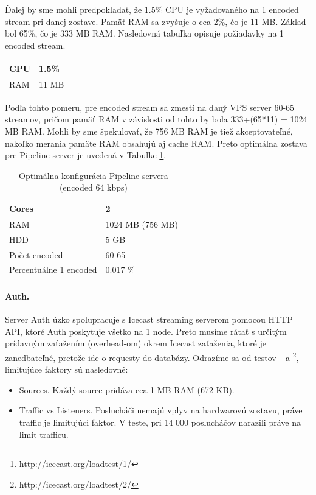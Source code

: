 \documentclass[11pt]{article}
\begin{document}
Ďalej by sme mohli predpokladať, že 1.5\% CPU je vyžadovaného na 1 encoded stream pri danej zostave. Pamäť RAM sa zvyšuje o cca 2\%, čo je 11 MB. Základ bol 65\%, čo je 333 MB RAM. Nasledovná tabuľka opisuje požiadavky na 1 encoded stream.


\begin{center}
\begin{tabular}{|l|l|}
\hline
	CPU & 1.5\%\\
\hline
	RAM & 11 MB\\
\hline
\end{tabular}
\end{center}

Podľa tohto pomeru, pre encoded stream sa zmestí na daný VPS server 60-65 streamov, pričom pamäť RAM v závislosti od tohto by bola 333+(65*11) = 1024 MB RAM. Mohli by sme špekulovať, že 756 MB RAM je tiež akceptovateľné, nakoľko merania pamäte RAM obsahujú aj cache RAM. Preto optimálna zostava pre Pipeline server je uvedená v Tabuľke \ref{konf2}.

\begin{table}[htp]
\centering
\begin{tabular}{|l|l|}
\hline
	Cores & 2\\
\hline
	RAM & 1024 MB (756 MB)\\
\hline
	HDD & 5 GB\\
\hline
	Počet encoded & 60-65\\
\hline
	Percentuálne 1 encoded & 0.017 \%\\
\hline
\end{tabular}
\caption{Optimálna konfigurácia Pipeline servera (encoded 64 kbps)}
\label{konf2}
\end{table}






\paragraph{Auth.} Server Auth úzko spolupracuje s Icecast streaming serverom pomocou HTTP API, ktoré Auth poskytuje všetko na 1 node. Preto musíme rátať s určitým prídavným zaťažením (overhead-om) okrem Icecast zaťaženia, ktoré je zanedbateľné, pretože ide o requesty do databázy. Odrazíme sa od testov \footnote{http://icecast.org/loadtest/1/} a \footnote{http://icecast.org/loadtest/2/}, limitujúce faktory sú nasledovné:

\begin{itemize}[noitemsep]
\item Sources. Každý source pridáva cca 1 MB RAM (672 KB).
\item Traffic vs Listeners. Poslucháči nemajú vplyv na hardwarovú zostavu, práve traffic je limitujúci faktor. V teste, pri 14 000 poslucháčov narazili práve na limit trafficu.  
\end{itemize}
\end{document}
